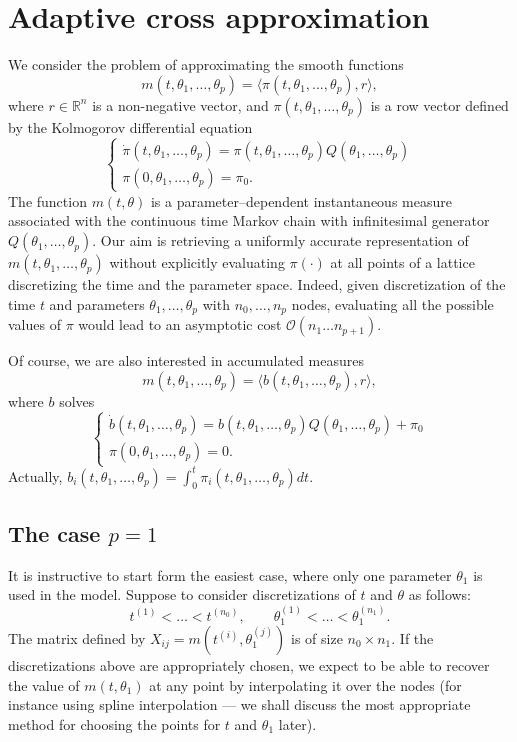 \documentclass[]{article}
\begin{document}
\section{Adaptive cross approximation}

We consider the problem of approximating the smooth functions 
\[
    m(t, \theta_1, \ldots, \theta_p) = 
      \langle 
        \pi(t, \theta_1, \ldots, \theta_p), 
        r
       \rangle,
\]
where $r \in \mathbb R^n$ is a non-negative vector, 
and $\pi(t, \theta_1, \ldots, \theta_p)$ is
a row vector defined by 
the Kolmogorov differential equation
\[
    \begin{cases}
        \dot{\pi}(t, \theta_1, \ldots, \theta_p) = \pi(t, \theta_1, \ldots, \theta_p) Q(\theta_1, \ldots, \theta_p) \\ 
        \pi(0, \theta_1, \ldots, \theta_p) = \pi_0. 
    \end{cases}
\]
The function 
$m(t, \theta)$ is a parameter--dependent instantaneous measure associated with
the continuous time
Markov chain with infinitesimal generator 
$Q(\theta_1, \ldots, \theta_p)$. Our aim is 
retrieving a uniformly accurate representation of 
$m(t, \theta_1, \ldots, \theta_p)$ without explicitly 
evaluating $\pi(\cdot)$ at all points 
of a lattice discretizing the time and the parameter space. 
Indeed, given discretization of the time $t$ and parameters 
$\theta_1, \ldots, \theta_p$ with $n_0, \ldots, n_p$ 
nodes, evaluating all the possible 
values of $\pi$ would lead to an asymptotic cost 
$\mathcal O(n_1 \ldots n_{p+1})$. 

Of course, we are also interested in accumulated measures
\[
m(t, \theta_1, \ldots, \theta_p) = 
\langle 
b(t, \theta_1, \ldots, \theta_p), 
r
\rangle,
\]
where $b$ solves
\[
\begin{cases}
\dot{b}(t, \theta_1, \ldots, \theta_p) = b(t, \theta_1, \ldots, \theta_p) Q(\theta_1, \ldots, \theta_p) + \pi_0\\ 
\pi(0, \theta_1, \ldots, \theta_p) = 0. 
\end{cases}
\]
Actually, $b_i(t, \theta_1, \ldots, \theta_p)=\int_0^t \pi_i(t, \theta_1, \ldots, \theta_p) dt$.

\subsection{The case $p = 1$}

It is instructive to start form the easiest case, where only 
one parameter $\theta_1$ is used in the model. Suppose to 
consider discretizations of $t$ and $\theta$ 
as follows:
\[
    t^{(1)} < \ldots < t^{(n_0)}, \qquad 
    \theta_1^{(1)} < \ldots < \theta_1^{(n_1)}. 
\]
The matrix defined by $X_{ij} = m(t^{(i)}, \theta_1^{(j)})$ is of 
size $n_0 \times n_1$. If the discretizations above are 
appropriately chosen, we expect to be able to recover the 
value of $m(t, \theta_1)$ at any point by interpolating it 
over the nodes (for instance using spline interpolation --- we shall 
discuss the most appropriate method for choosing the points for 
$t$ and $\theta_1$ later). 
\end{document}
